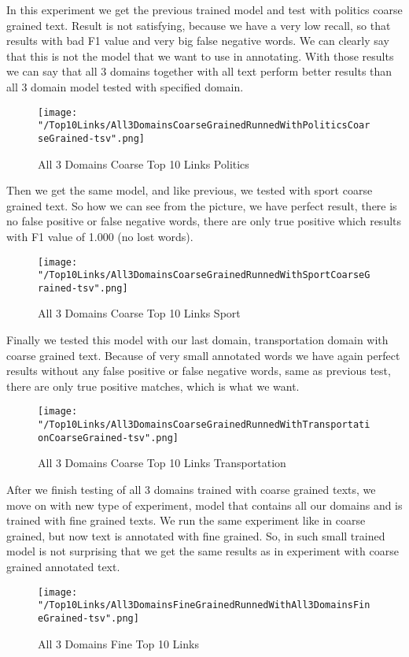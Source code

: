 \documentclass[thesis=M,english]{FITthesis}[2018/05/30]
\begin{document}
	
	In this experiment we get the previous trained model and test with politics coarse grained text. Result is not satisfying, because we have a very low recall, so that results with bad F1 value and very big false negative words. We can clearly say that this is not the model that we want to use in annotating. With those results we can say that all 3 domains together with all text perform better results than all 3 domain model tested with specified domain.  
	\begin{figure}\centering
		\texttt{[image: "/Top10Links/All3DomainsCoarseGrainedRunnedWithPoliticsCoarseGrained-tsv".png]}
		\caption{All 3 Domains Coarse Top 10 Links Politics}\label{}
	\end{figure}	

	Then we get the same model, and like previous, we tested with sport coarse grained text. So how we can see from the picture, we have perfect result, there is no false positive or false negative words, there are only true positive which results with F1 value of 1.000 (no lost words).
	\begin{figure}\centering
		\texttt{[image: "/Top10Links/All3DomainsCoarseGrainedRunnedWithSportCoarseGrained-tsv".png]}
		\caption{All 3 Domains Coarse Top 10 Links Sport}\label{}
	\end{figure}
	
	Finally we tested this model with our last domain, transportation domain with coarse grained text.	Because of very small annotated words we have again perfect results without any false positive or false negative words, same as previous test, there are only true positive matches, which is what we want.
	\begin{figure}\centering
		\texttt{[image: "/Top10Links/All3DomainsCoarseGrainedRunnedWithTransportationCoarseGrained-tsv".png]}
		\caption{All 3 Domains Coarse Top 10 Links Transportation}\label{}	
	\end{figure}
		
	
	After we finish testing of all 3 domains trained with coarse grained texts, we move on with new type of experiment, model that contains all our domains and is trained with fine grained texts. We run the same experiment like in coarse grained, but now text is annotated with fine grained. So, in such small trained model is not surprising that we get the same results as in experiment with coarse grained annotated text.
	\begin{figure}\centering
		\texttt{[image: "/Top10Links/All3DomainsFineGrainedRunnedWithAll3DomainsFineGrained-tsv".png]}
		\caption{All 3 Domains Fine Top 10 Links }\label{}	
	\end{figure}
	
\end{document}
